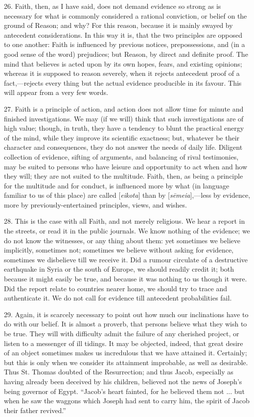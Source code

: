 26. Faith, then, as I have said, does not demand evidence so strong
as is necessary for what is commonly considered a rational conviction,
or belief on the ground of Reason; and why? For this reason, because
it is mainly swayed by antecedent considerations. In this way it is,
that the two principles are opposed to one another: Faith is
influenced by previous notices, prepossessions, and (in a good sense
of the word) prejudices; but Reason, by direct and definite proof. The
mind that believes is acted upon by its own hopes, fears, and existing
opinions; whereas it is supposed to reason severely, when it rejects
antecedent proof of a fact,—rejects every thing but the actual
evidence producible in its favour. This will appear from a very few
words.

27. Faith is a principle of action, and action does not allow time
for minute and finished investigations. We may (if we will) think that
such investigations are of high value; though, in truth, they have a
tendency to blunt the practical energy of the mind, while they improve
its scientific exactness; but, whatever be their character and
consequences, they do not answer the needs of daily life. Diligent
collection of evidence, sifting of arguments, and balancing of rival
testimonies, may be suited to persons who have leisure and opportunity
to act when and how they will; they are not suited to the multitude.
Faith, then, as being a principle for the multitude and for conduct,
is influenced more by what (in language familiar to us of this place)
are called [\emph{eikota}] than by
[\emph{s\={e}meia}],—less
by evidence, more by previously-entertained principles, views, and
wishes.

28. This is the case with all Faith, and not merely religious. We
hear a report in the streets, or read it in the public journals. We
know nothing of the evidence; we do not know the witnesses, or any
thing about them: yet sometimes we believe implicitly, sometimes not;
sometimes we believe without asking for evidence, sometimes we
disbelieve till we receive it. Did a rumour circulate of a destructive
earthquake in Syria or the south of Europe, we should readily credit
it; both because it might easily be true, and because it was nothing
to us though it were. Did the report relate to countries nearer home,
we should try to trace and authenticate it. We do not call for
evidence till antecedent probabilities fail.

29. Again, it is scarcely necessary to point out how much our
inclinations have to do with our belief. It is almost a proverb, that
persons believe what they wish to be true. They will with difficulty
admit the failure of any cherished project, or listen to a messenger
of ill tidings. It may be objected, indeed, that great desire of an
object sometimes makes us incredulous that we have attained it.
Certainly; but this is only when we consider its attainment
improbable, as well as desirable. Thus St. Thomas doubted of the
Resurrection; and thus Jacob, especially as having already been
deceived by his children, believed not the news of Joseph's being
governor of Egypt. ``Jacob's heart fainted, for he believed them
not ... but when he saw the waggons which Joseph had sent to carry
him, the spirit of Jacob their father revived.''

